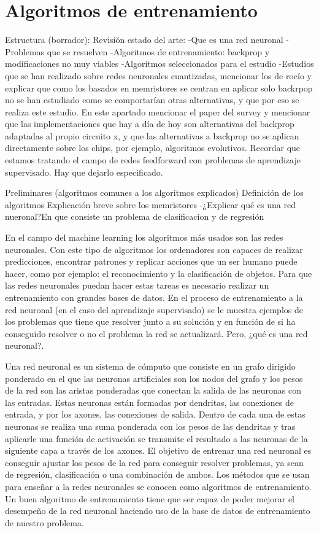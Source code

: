 \chapter{Algoritmos de entrenamiento}

Estructura (borrador):
Revisión estado del arte: 
    -Que es una red neuronal   
    -Problemas que se resuelven  
    -Algoritmos de entrenamiento: backprop y modificaciones no muy viables 
    -Algoritmos seleccionados para el estudio  
    -Estudios que se han realizado sobre redes neuronales cuantizadas, mencionar los de rocío y explicar que como los basados en memristores se centran en aplicar solo backrpop no se han estudiado como se comportarían otras alternativas, y que por eso se realiza este estudio. En este apartado mencionar el paper del survey y mencionar que las implementaciones que hay a día de hoy son alternativas del backprop adaptadas al propio circuito x, y que las alternativas a backprop no se aplican directamente sobre los chips, por ejemplo, algoritmos evolutivos. Recordar que estamos tratando el campo de redes feedforward con problemas de aprendizaje supervisado. Hay que dejarlo especificado.

Preliminares (algoritmos comunes a los algoritmos explicados)
Definición de los algoritmos
Explicación breve sobre los memristores
-¿Explicar qué es una red nueronal?En que consiste un problema de clasificacion y de regresión

En el campo del machine learning los algoritmos más usados son las redes neuronales. Con este tipo de algoritmos los ordenadores son capaces de realizar predicciones, encontrar patrones y replicar acciones que un ser humano puede hacer, como por ejemplo: el reconocimiento y la clasificación de objetos. Para que las redes neuronales puedan hacer estas tareas es necesario realizar un entrenamiento con grandes bases de datos. En el proceso de entrenamiento a la red neuronal (en el caso del aprendizaje supervisado) se le muestra ejemplos de los problemas que tiene que resolver junto a su solución y en función de si ha conseguido resolver o no el problema la red se actualizará. Pero, ¿qué es una red neuronal?.

Una red neuronal \cite{RefWorks:RefID:22-jain1996artificial} es un sistema de cómputo que consiste en un grafo dirigido ponderado en el que las neuronas artificiales son los nodos del grafo y los pesos de la red son las  aristas ponderadas que conectan la salida de las neuronas con las entradas. Estas neuronas están formadas por dendritas, las conexiones de entrada, y por los axones, las conexiones de salida. Dentro de cada una de estas neuronas se realiza una suma ponderada con los pesos de las dendritas y tras aplicarle una función de activación se transmite el resultado a las neuronas de la siguiente capa a través de los axones. El objetivo de entrenar una red neuronal es conseguir ajustar los pesos de la red para conseguir resolver problemas, ya sean de regresión, clasificación o una combinación de ambos. Los métodos que se usan para enseñar a la redes neuronales se conocen como algoritmos de entrenamiento. Un buen algoritmo de entrenamiento tiene que ser capaz de poder mejorar el desempeño de la red neuronal haciendo uso de la base de datos de entrenamiento de nuestro problema.

